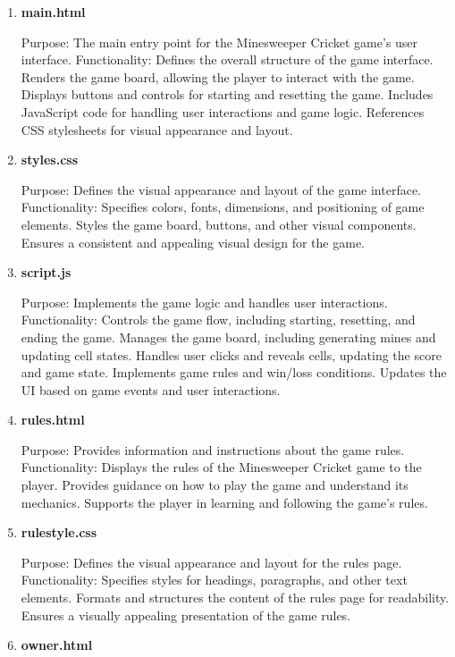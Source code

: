 \documentclass{article}
\begin{document}
\begin{enumerate}
  \item \textbf{main.html}
  
  Purpose: The main entry point for the Minesweeper Cricket game's user interface.
  Functionality:
  Defines the overall structure of the game interface.
  Renders the game board, allowing the player to interact with the game.
  Displays buttons and controls for starting and resetting the game.
  Includes JavaScript code for handling user interactions and game logic.
  References CSS stylesheets for visual appearance and layout.

  \item \textbf{styles.css}

  Purpose: Defines the visual appearance and layout of the game interface.
  Functionality:
  Specifies colors, fonts, dimensions, and positioning of game elements.
  Styles the game board, buttons, and other visual components.
  Ensures a consistent and appealing visual design for the game.

  \item \textbf{script.js}

  Purpose: Implements the game logic and handles user interactions.
  Functionality:
  Controls the game flow, including starting, resetting, and ending the game.
  Manages the game board, including generating mines and updating cell states.
  Handles user clicks and reveals cells, updating the score and game state.
  Implements game rules and win/loss conditions.
  Updates the UI based on game events and user interactions.

  \item \textbf{rules.html}

  Purpose: Provides information and instructions about the game rules.
  Functionality:
  Displays the rules of the Minesweeper Cricket game to the player.
  Provides guidance on how to play the game and understand its mechanics.
  Supports the player in learning and following the game's rules.

  \item \textbf{rulestyle.css}

  Purpose: Defines the visual appearance and layout for the rules page.
  Functionality:
  Specifies styles for headings, paragraphs, and other text elements.
  Formats and structures the content of the rules page for readability.
  Ensures a visually appealing presentation of the game rules.

  \item \textbf{owner.html}


\end{enumerate}
\end{document}
